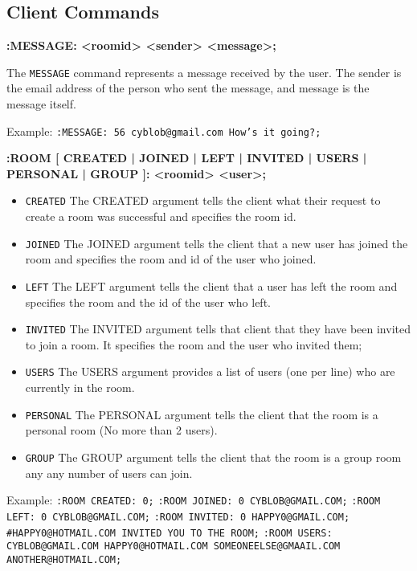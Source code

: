 \subsection{Client Commands}

{\bf :MESSAGE: <roomid> <sender> <message>;}

The \texttt{MESSAGE} command represents a message received by the user. The sender is the email address of the person who sent the message, and message is the message itself.

Example:
\texttt{:MESSAGE: 56 cyblob@gmail.com How’s it going?;}

{\bf :ROOM [ CREATED | JOINED | LEFT | INVITED | USERS | PERSONAL | GROUP ]: <roomid> {<user>};}

\begin{itemize}

\item \texttt{CREATED}
The CREATED argument tells the client what their request to create a room was successful and specifies the room id.

\item \texttt{JOINED}
The JOINED argument tells the client that a new user has joined the room and specifies the room and id of the user who joined.

\item \texttt{LEFT}
The LEFT argument tells the client that a user has left the room and specifies the room and the id of the user who left.

\item \texttt{INVITED}
The INVITED argument tells that client that they have been invited to join a room. It specifies the room and the user who invited them;

\item \texttt{USERS}
The USERS argument provides a list of users (one per line) who are currently in the room.

\item \texttt{PERSONAL}
The PERSONAL argument tells the client that the room is a personal room (No more than 2 users).

\item \texttt{GROUP}
The GROUP argument tells the client that the room is a group room any any number of users can join.
	
\end{itemize}

Example:
\texttt{:ROOM CREATED: 0;}
\texttt{:ROOM JOINED: 0 CYBLOB@GMAIL.COM;}
\texttt{:ROOM LEFT: 0 CYBLOB@GMAIL.COM;}
\texttt{:ROOM INVITED: 0 HAPPY0@GMAIL.COM; #HAPPY0@HOTMAIL.COM INVITED YOU TO THE ROOM;}
\texttt{:ROOM USERS: CYBLOB@GMAIL.COM HAPPY0@HOTMAIL.COM SOMEONEELSE@GMAAIL.COM ANOTHER@HOTMAIL.COM;}

